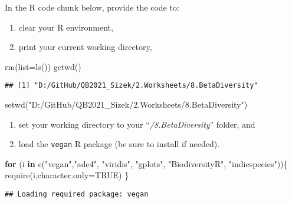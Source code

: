 \documentclass[
]{article}
\newenvironment{Shaded}{\begin{snugshade}}{\end{snugshade}}
\newcommand{\AttributeTok}[1]{\textcolor[rgb]{0.77,0.63,0.00}{#1}}
\newcommand{\ConstantTok}[1]{\textcolor[rgb]{0.00,0.00,0.00}{#1}}
\newcommand{\ControlFlowTok}[1]{\textcolor[rgb]{0.13,0.29,0.53}{\textbf{#1}}}
\newcommand{\FunctionTok}[1]{\textcolor[rgb]{0.00,0.00,0.00}{#1}}
\newcommand{\NormalTok}[1]{#1}
\newcommand{\StringTok}[1]{\textcolor[rgb]{0.31,0.60,0.02}{#1}}
\providecommand{\tightlist}{%
  \setlength{\itemsep}{0pt}\setlength{\parskip}{0pt}}
\begin{document}
In the R code chunk below, provide the code to:

\begin{enumerate}
\def\labelenumi{\arabic{enumi}.}
\tightlist
\item
  clear your R environment,
\item
  print your current working directory,
\end{enumerate}

\begin{Shaded}
\begin{Highlighting}[]
\FunctionTok{rm}\NormalTok{(}\AttributeTok{list=}\FunctionTok{ls}\NormalTok{())}
\FunctionTok{getwd}\NormalTok{()}
\end{Highlighting}
\end{Shaded}

\begin{verbatim}
## [1] "D:/GitHub/QB2021_Sizek/2.Worksheets/8.BetaDiversity"
\end{verbatim}

\begin{Shaded}
\begin{Highlighting}[]
\FunctionTok{setwd}\NormalTok{(}\StringTok{"D:/GitHub/QB2021\_Sizek/2.Worksheets/8.BetaDiversity"}\NormalTok{)}
\end{Highlighting}
\end{Shaded}

\begin{enumerate}
\def\labelenumi{\arabic{enumi}.}
\setcounter{enumi}{2}
\tightlist
\item
  set your working directory to your ``\emph{/8.BetaDiversity}'' folder,
  and
\item
  load the \texttt{vegan} R package (be sure to install if needed).
\end{enumerate}

\begin{Shaded}
\begin{Highlighting}[]
\ControlFlowTok{for}\NormalTok{ (i  }\ControlFlowTok{in} \FunctionTok{c}\NormalTok{(}\StringTok{"vegan"}\NormalTok{,}\StringTok{"ade4"}\NormalTok{, }\StringTok{"viridis"}\NormalTok{, }\StringTok{"gplots"}\NormalTok{, }\StringTok{"BiodiversityR"}\NormalTok{, }\StringTok{"indicspecies"}\NormalTok{))\{}
  \FunctionTok{require}\NormalTok{(i,}\AttributeTok{character.only=}\ConstantTok{TRUE}\NormalTok{)}
\NormalTok{\}}
\end{Highlighting}
\end{Shaded}

\begin{verbatim}
## Loading required package: vegan
\end{verbatim}
\end{document}
